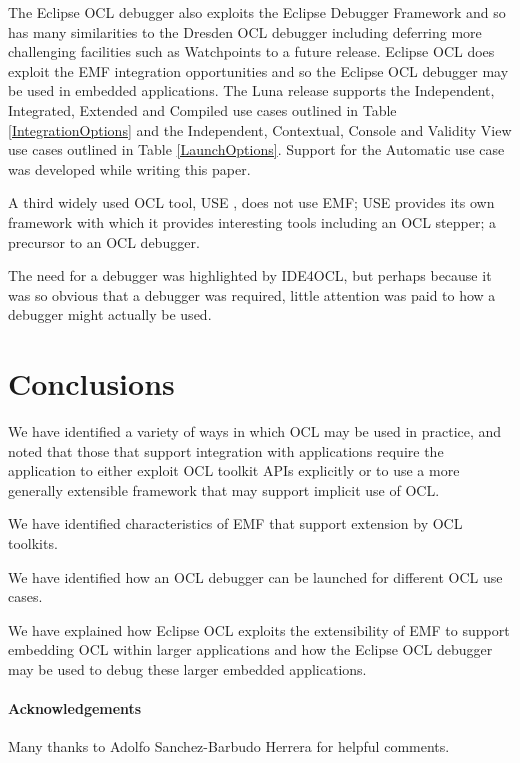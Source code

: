 \documentclass[a4paper]{article}
\begin{document}
The Eclipse OCL debugger also exploits the Eclipse Debugger Framework and so has many similarities to the Dresden OCL debugger including deferring more challenging facilities such as Watchpoints to a future release. Eclipse OCL does exploit the EMF integration opportunities and so the Eclipse OCL debugger may be used in embedded applications. The Luna release \cite{OCL-Luna} supports the Independent, Integrated, Extended and Compiled use cases outlined in Table \ref{IntegrationOptions} and the Independent, Contextual, Console and Validity View use cases outlined in Table \ref{LaunchOptions}. Support for the Automatic use case was developed while writing this paper.

A third widely used OCL tool, USE \cite{USE}, does not use EMF; USE provides its own framework with which it provides interesting tools including an OCL stepper; a precursor to an OCL debugger.

The need for a debugger was highlighted by IDE4OCL\cite{Chimiak-Opaka}, but perhaps because it was so obvious that a debugger was required, little attention was paid to how a debugger might actually be used.

\section{Conclusions}\label{Conclusion}
We have identified a variety of ways in which OCL may be used in practice, and noted that those that support integration with applications require the application to either exploit OCL toolkit APIs explicitly or to use a more generally extensible framework that may support implicit use of OCL.

We have identified characteristics of EMF that support extension by OCL toolkits.

We have identified how an OCL debugger can be launched for different OCL use cases.

We have explained how Eclipse OCL exploits the extensibility of EMF to support embedding OCL within larger applications and how the Eclipse OCL debugger may be used to debug these larger embedded applications.

\paragraph{Acknowledgements}

Many thanks to Adolfo Sanchez-Barbudo Herrera for helpful comments.

% 
%
\end{document}

